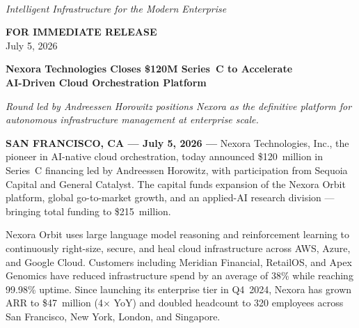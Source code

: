 \documentclass[10pt,a4paper]{article}
\newcommand{\hrulethick}{{\color{accent}\rule{\linewidth}{2pt}}}
\newcommand{\hrulethin}{{\color{ruled}\rule{\linewidth}{0.5pt}}}
\begin{document}
\thispagestyle{empty}

\begin{minipage}[c]{0.48\linewidth}
  \\[1pt]
  {\color{muted}\fontsize{7.5}{9}\selectfont\itshape
    Intelligent Infrastructure for the Modern Enterprise}
\end{minipage}%
\hfill
\begin{minipage}[c]{0.46\linewidth}
  \raggedleft
  {\color{accent}\bfseries FOR IMMEDIATE RELEASE}\\[1pt]
  {\color{muted}\small July 5, 2026}
\end{minipage}

\vspace{3pt}\hrulethick\vspace{7pt}

{%
  {\fontsize{17}{21}\selectfont\bfseries\color{accentdark}%
    Nexora Technologies Closes \$120M Series~C to Accelerate\\
    AI-Driven Cloud Orchestration Platform}\par}
\vspace{3pt}
{\color{muted}\fontsize{10.5}{13}\selectfont\itshape
  Round led by Andreessen Horowitz positions Nexora as the definitive platform
  for autonomous infrastructure management at enterprise scale.}\par
\vspace{5pt}\hrulethin\vspace{6pt}

{\bfseries SAN FRANCISCO, CA — July 5, 2026 —}
Nexora Technologies, Inc., the pioneer in AI-native cloud orchestration,
today announced \$120~million in Series~C financing led by Andreessen
Horowitz, with participation from Sequoia Capital and General Catalyst.
The capital funds expansion of the Nexora Orbit platform, global
go-to-market growth, and an applied-AI research division — bringing total
funding to \$215~million.

Nexora Orbit uses large language model reasoning and reinforcement learning
to continuously right-size, secure, and heal cloud infrastructure across
AWS, Azure, and Google Cloud. Customers including Meridian Financial,
RetailOS, and Apex Genomics have reduced infrastructure spend by an average
of 38\% while reaching 99.98\% uptime. Since launching its enterprise tier
in Q4~2024, Nexora has grown ARR to \$47~million (4$\times$ YoY) and
doubled headcount to 320 employees across San Francisco, New York, London,
and Singapore.
\end{document}
